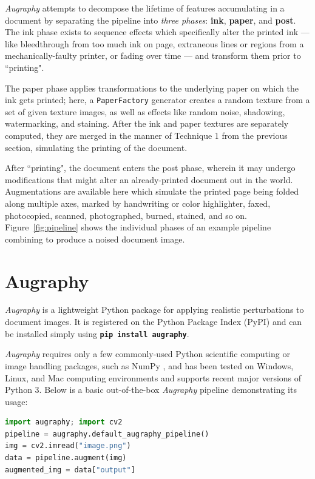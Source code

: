 \documentclass[runningheads]{llncs}
\begin{document}
\emph{Augraphy} attempts to decompose the lifetime of features accumulating in a document by separating the pipeline into \emph{three phases}: \textbf{ink}, \textbf{paper}, and \textbf{post}.
The ink phase exists to sequence effects which specifically alter the printed ink --- like bleedthrough from too much ink on page, extraneous lines or regions from a mechanically-faulty printer, or fading over time --- and transform them prior to ``printing".

The paper phase applies transformations to the underlying paper on which the ink gets printed; here, a \texttt{PaperFactory} generator creates a random texture from a set of given texture images, as well as effects like random noise, shadowing, watermarking, and staining.
After the ink and paper textures are separately computed, they are merged in the manner of Technique 1 from the previous section, simulating the printing of the document.

After ``printing", the document enters the post phase, wherein it may undergo modifications that might alter an already-printed document out in the world.
Augmentations are available here which simulate the printed page being folded along multiple axes, marked by handwriting or color highlighter, faxed, photocopied, scanned, photographed, burned, stained, and so on.
Figure~\ref{fig:pipeline} shows the individual phases of an example pipeline combining to produce a noised document image.

\section{Augraphy}

\emph{Augraphy} is a lightweight Python package for applying realistic perturbations to document images. It is registered on the Python Package Index (PyPI) and can be installed simply using \colorbox{superlightgray}{\textbf{\texttt{pip install augraphy}}}.

\emph{Augraphy} requires only a few commonly-used Python scientific computing or image handling packages, such as NumPy \cite{ref_numpy}, and has been tested on Windows, Linux, and Mac computing environments and supports recent major versions of Python 3. Below is a basic out-of-the-box \emph{Augraphy} pipeline demonstrating its usage:

\begin{lstlisting}[language=Python, label={lst:sample-code}, caption={Augmenting a document image with \emph{Augraphy}.}]
import augraphy; import cv2
pipeline = augraphy.default_augraphy_pipeline()
img = cv2.imread("image.png")
data = pipeline.augment(img)
augmented_img = data["output"]
\end{lstlisting}
\end{document}
